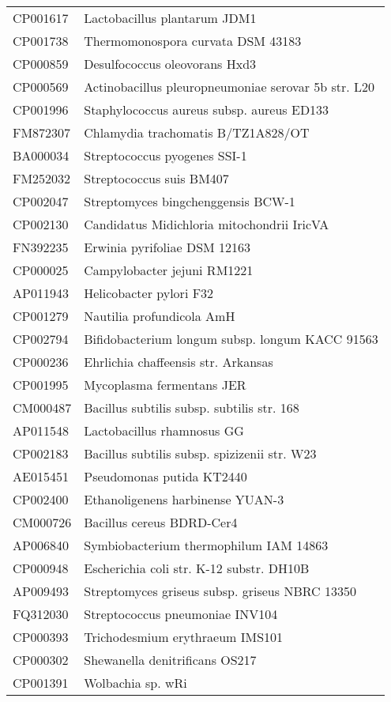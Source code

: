 \begin{longtable}{ll}
CP001617 & Lactobacillus plantarum JDM1\\
CP001738 & Thermomonospora curvata DSM 43183\\
CP000859 & Desulfococcus oleovorans Hxd3\\
CP000569 & Actinobacillus pleuropneumoniae serovar 5b str. L20\\
CP001996 & Staphylococcus aureus subsp. aureus ED133\\
FM872307 & Chlamydia trachomatis B/TZ1A828/OT\\
BA000034 & Streptococcus pyogenes SSI-1\\
FM252032 & Streptococcus suis BM407\\
CP002047 & Streptomyces bingchenggensis BCW-1\\
CP002130 & Candidatus Midichloria mitochondrii IricVA\\
FN392235 & Erwinia pyrifoliae DSM 12163\\
CP000025 & Campylobacter jejuni RM1221\\
AP011943 & Helicobacter pylori F32\\
CP001279 & Nautilia profundicola AmH\\
CP002794 & Bifidobacterium longum subsp. longum KACC 91563\\
CP000236 & Ehrlichia chaffeensis str. Arkansas\\
CP001995 & Mycoplasma fermentans JER\\
CM000487 & Bacillus subtilis subsp. subtilis str. 168\\
AP011548 & Lactobacillus rhamnosus GG\\
CP002183 & Bacillus subtilis subsp. spizizenii str. W23\\
AE015451 & Pseudomonas putida KT2440\\
CP002400 & Ethanoligenens harbinense YUAN-3\\
CM000726 & Bacillus cereus BDRD-Cer4\\
AP006840 & Symbiobacterium thermophilum IAM 14863\\
CP000948 & Escherichia coli str. K-12 substr. DH10B\\
AP009493 & Streptomyces griseus subsp. griseus NBRC 13350\\
FQ312030 & Streptococcus pneumoniae INV104\\
CP000393 & Trichodesmium erythraeum IMS101\\
CP000302 & Shewanella denitrificans OS217\\
CP001391 & Wolbachia sp. wRi\\

\end{longtable}
